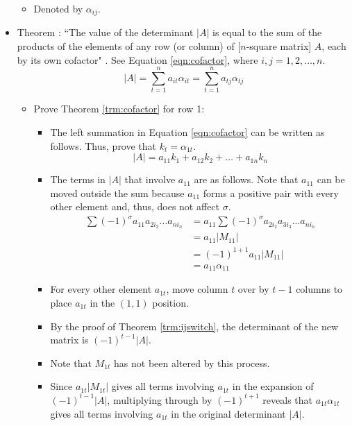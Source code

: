 \documentclass[titlepage]{article}
\newcounter{theorem}
\newcommand{\newtrm}[1]{\refstepcounter{theorem}\label{#1}Theorem \thetheorem: }
\numberwithin{figure}{section}
\numberwithin{equation}{section}
\numberwithin{theorem}{section}
\newcommand{\dq}[4][]{``#2"#1 \cite[#4]{#3}.}
\begin{document}
\begin{itemize}
\begin{itemize}
        \item Denoted by $\alpha_{ij}$.
    \end{itemize}
    \item \newtrm{trm:cofactor}\dq{The value of the determinant $|A|$ is equal to the sum of the products of the elements of any row (or column) of [$n$-square matrix] $A$, each by its own cofactor}{bib:determinants}{18} See Equation \ref{eqn:cofactor}, where $i,j=1,2,\dots,n$.
    \begin{equation}\label{eqn:cofactor}
        |A| = \sum_{t=1}^na_{it}\alpha_{it} = \sum_{t=1}^na_{tj}\alpha_{tj}
    \end{equation}
    \begin{itemize}
        \item Prove Theorem \ref{trm:cofactor} for row 1:
        \begin{itemize}
            \item The left summation in Equation \ref{eqn:cofactor} can be written as follows. Thus, prove that $k_t=\alpha_{1t}$.
            \begin{equation*}
                |A|=a_{11}k_1+a_{12}k_2+\dots+a_{1n}k_n
            \end{equation*}
            \item The terms in $|A|$ that involve $a_{11}$ are as follows. Note that $a_{11}$ can be moved outside the sum because $a_{11}$ forms a positive pair with every other element and, thus, does not affect $\sigma$.
            \begin{align*}
                \sum (-1)^\sigma a_{11}a_{2i_2}\dots a_{ni_n} &= a_{11}\sum (-1)^\sigma a_{2i_2}a_{3i_3}\dots a_{ni_n}\\
                &= a_{11}|M_{11}|\\
                &= (-1)^{1+1}a_{11}|M_{11}|\\
                &= a_{11}\alpha_{11}
            \end{align*}
            \item For every other element $a_{1t}$, move column $t$ over by $t-1$ columns to place $a_{1t}$ in the $(1,1)$ position.
            \item By the proof of Theorem \ref{trm:ijswitch}, the determinant of the new matrix is $(-1)^{t-1}|A|$.
            \item Note that $M_{1t}$ has not been altered by this process.
            \item Since $a_{1t}|M_{1t}|$ gives all terms involving $a_{1t}$ in the expansion of $(-1)^{t-1}|A|$, multiplying through by $(-1)^{t+1}$ reveals that $a_{1t}\alpha_{1t}$ gives all terms involving $a_{1t}$ in the original determinant $|A|$.

\end{itemize}
\end{itemize}
\end{itemize}
\end{document}
